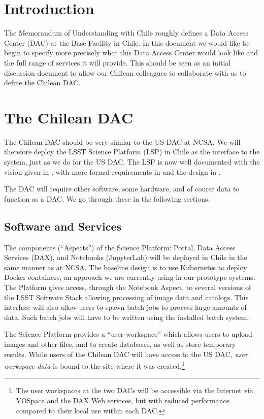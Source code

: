 \section{Introduction}

The Memorandum of Understanding with Chile  roughly defines a Data Access Center (DAC) at the Base Facility in Chile.
In this document we would like to begin to specify more precisely what this Data Access Center would look like and the full range of services it will provide.
This should be seen as an initial discussion document to allow our Chilean colleagues to collaborate with us to define the Chilean DAC.

\section{The Chilean DAC}

The Chilean DAC should be very similar to the US DAC at NCSA.
We will therefore deploy the LSST Science Platform (LSP) in Chile as the interface to the system, 
just as we do for the US DAC.
The LSP is now well documented with the vision given in , with more formal requirements in  and the design in .

The DAC will require other software, some  hardware, and of course data to function as a DAC.
We go through these in the following sections.


\subsection{Software and Services}

The components (``Aspects'') of the Science Platform: Portal, Data Access Services (DAX), and Notebooks (JupyterLab) will be deployed in Chile in the same manner as at NCSA.
The baseline design is to use Kubernetes to deploy Docker containers, an approach we are currently using in our prototype systems.
The Platform gives access, through the Notebook Aspect, to several versions of the LSST Software Stack allowing processing of image data and catalogs.
This interface will also allow users to spawn batch jobs to process large amounts of data.
Such batch jobs will have to be written using the installed batch system.

The Science Platform provides a ``user workspace'' which allows users to upload images and other files, and to create databases, as well as store temporary results.
While users of the Chilean DAC will have access to the US DAC, \emph{user workspace data} is bound to the site where it was created.\footnote{The user workspaces at the two DACs will be accessible via the Internet via VOSpace and the DAX Web services, but with reduced performance compared to their local use within each DAC.}

